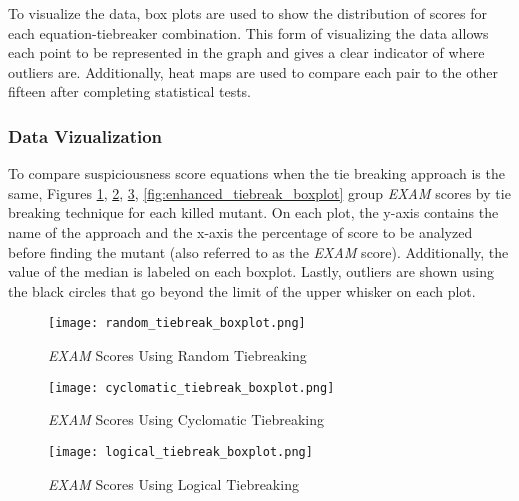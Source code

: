 To visualize the data, box plots are
used to show the distribution of scores for each equation-tiebreaker
combination. This form of visualizing the data allows each point to be
represented in the graph and gives a clear indicator of where outliers are.
Additionally, heat maps are used to compare each pair to the other fifteen after
completing statistical tests.

\subsubsection{Data Vizualization}
\label{subsubsec:data_vizualization}

To compare suspiciousness score equations when the tie breaking approach is the
same, Figures \ref{fig:random_tiebreak_boxplot},
\ref{fig:cyclomatic_tiebreak_boxplot}, \ref{fig:logical_tiebreak_boxplot}, \ref{fig:enhanced_tiebreak_boxplot}
group \emph{EXAM} scores by tie breaking technique for each killed mutant. On
each plot, the y-axis contains the name of the approach and the x-axis the
percentage of score to be analyzed before finding the mutant (also referred to
as the \emph{EXAM} score). Additionally, the value of the median is labeled on
each boxplot. Lastly, outliers are shown using the black circles that go beyond
the limit of the upper whisker on each plot.

\begin{figure}[!htb]
	\begin{center}
		\texttt{[image: random\_tiebreak\_boxplot.png]}
		\caption{\label{fig:random_tiebreak_boxplot} \emph{EXAM} Scores Using
		Random Tiebreaking}
	\end{center}
\end{figure}

\begin{figure}[!htb]
	\begin{center}
		\texttt{[image: cyclomatic\_tiebreak\_boxplot.png]}
		\caption{\label{fig:cyclomatic_tiebreak_boxplot} \emph{EXAM} Scores Using
		Cyclomatic Tiebreaking}
	\end{center}
\end{figure}

\begin{figure}[!htb]
	\begin{center}
		\texttt{[image: logical\_tiebreak\_boxplot.png]}
		\caption{\label{fig:logical_tiebreak_boxplot} \emph{EXAM} Scores Using
		Logical Tiebreaking}
	\end{center}
\end{figure}

